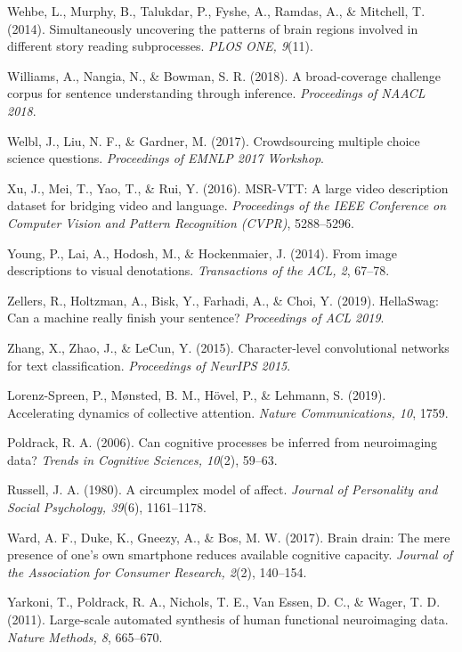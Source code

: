 \documentclass[11pt,letterpaper]{article}
\numberwithin{equation}{section}
\begin{document}
Wehbe, L., Murphy, B., Talukdar, P., Fyshe, A., Ramdas, A., \& Mitchell, T. (2014). Simultaneously uncovering the patterns of brain regions involved in different story reading subprocesses. \textit{PLOS ONE, 9}(11).

Williams, A., Nangia, N., \& Bowman, S. R. (2018). A broad-coverage challenge corpus for sentence understanding through inference. \textit{Proceedings of NAACL 2018}.

Welbl, J., Liu, N. F., \& Gardner, M. (2017). Crowdsourcing multiple choice science questions. \textit{Proceedings of EMNLP 2017 Workshop}.

Xu, J., Mei, T., Yao, T., \& Rui, Y. (2016). MSR-VTT: A large video description dataset for bridging video and language. \textit{Proceedings of the IEEE Conference on Computer Vision and Pattern Recognition (CVPR)}, 5288--5296.

Young, P., Lai, A., Hodosh, M., \& Hockenmaier, J. (2014). From image descriptions to visual denotations. \textit{Transactions of the ACL, 2}, 67--78.

Zellers, R., Holtzman, A., Bisk, Y., Farhadi, A., \& Choi, Y. (2019). HellaSwag: Can a machine really finish your sentence? \textit{Proceedings of ACL 2019}.

Zhang, X., Zhao, J., \& LeCun, Y. (2015). Character-level convolutional networks for text classification. \textit{Proceedings of NeurIPS 2015}.

Lorenz-Spreen, P., Mønsted, B. M., Hövel, P., \& Lehmann, S. (2019). Accelerating dynamics of collective attention. \textit{Nature Communications, 10}, 1759.

Poldrack, R. A. (2006). Can cognitive processes be inferred from neuroimaging data? \textit{Trends in Cognitive Sciences, 10}(2), 59--63.

Russell, J. A. (1980). A circumplex model of affect. \textit{Journal of Personality and Social Psychology, 39}(6), 1161--1178.

Ward, A. F., Duke, K., Gneezy, A., \& Bos, M. W. (2017). Brain drain: The mere presence of one's own smartphone reduces available cognitive capacity. \textit{Journal of the Association for Consumer Research, 2}(2), 140--154.

Yarkoni, T., Poldrack, R. A., Nichols, T. E., Van Essen, D. C., \& Wager, T. D. (2011). Large-scale automated synthesis of human functional neuroimaging data. \textit{Nature Methods, 8}, 665--670.
\end{document}

